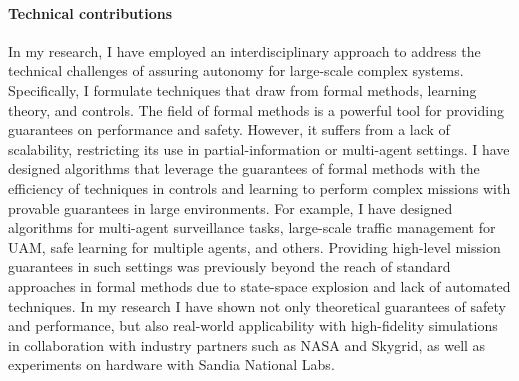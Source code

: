 
\paragraph{Technical contributions} In my research, I have employed an interdisciplinary approach to address the technical challenges of assuring autonomy for large-scale complex systems. Specifically, I formulate techniques that draw from formal methods, learning theory, and controls. The field of formal methods is a powerful tool for providing guarantees on performance and safety. However, it suffers from a lack of scalability, restricting its use in partial-information or multi-agent settings. I have designed algorithms that leverage the guarantees of formal methods with the efficiency of techniques in controls and learning to perform complex missions with provable guarantees in large environments. For example, I have designed algorithms for multi-agent surveillance tasks, large-scale traffic management for UAM, safe learning for multiple agents, and others. Providing high-level mission guarantees in such settings was previously beyond the reach of standard approaches in formal methods due to state-space explosion and lack of automated techniques. In my research I have shown not only theoretical guarantees of safety and performance, but also real-world applicability with high-fidelity simulations in collaboration with industry partners such as NASA and Skygrid, as well as experiments on hardware with Sandia National Labs.
